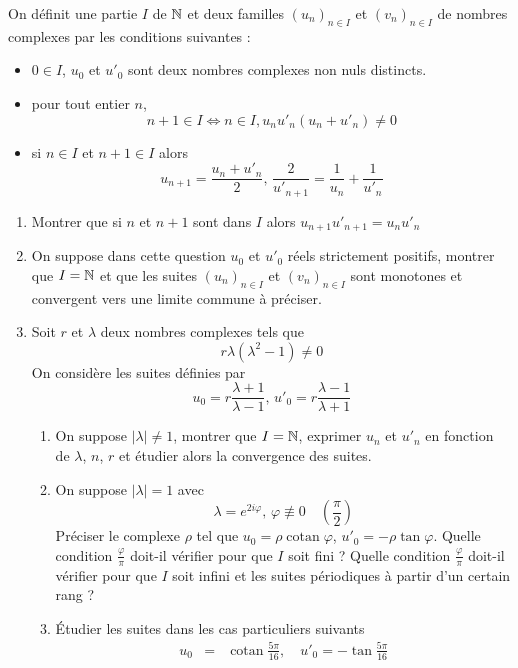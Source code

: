 On d{\'e}finit une partie $I$ de $\mathbb{N}$ et deux familles
$(u_n)_{n\in I}$ et $(v_n)_{n\in I}$ de nombres complexes par les
conditions suivantes :
\begin{itemize}
  \item $0\in I$, $u_0$ et $u'_0$ sont deux nombres complexes non
  nuls distincts.
  \item pour tout entier $n$,
  \[n+1\in I \Leftrightarrow n\in I , u_nu'_n(u_n+u'_n)\neq 0\]
  \item si $n\in I$ et $n+1\in I$ alors
  \[u_{n+1}=\frac{u_n+u'_n}{2},\, \frac{2}{u'_{n+1}}=\frac{1}{u_n}+\frac{1}{u'_n}\]
\end{itemize}
\begin{enumerate}
  \item Montrer que si $n$ et $n+1$ sont dans $I$ alors
  $u_{n+1}u'_{n+1}=u_{n}u'_{n}$
  \item On suppose dans cette question $u_0$ et $u'_0$ r{\'e}els
  strictement positifs, montrer que $I=\mathbb{N}$ et que les suites $(u_n)_{n\in I}$ et $(v_n)_{n\in
  I}$ sont monotones et convergent vers une limite commune {\`a}
  pr{\'e}ciser.
  \item Soit $r$ et $\lambda$ deux nombres complexes tels que
  \[r \lambda(\lambda^2-1)\neq 0\]
  On consid{\`e}re les suites d{\'e}finies par
  \[u_0=r\frac{\lambda+1}{\lambda-1},\, u'_0=r\frac{\lambda-1}{\lambda+1}\]
\begin{enumerate}
  \item On suppose $|\lambda|\neq 1$, montrer que $I=\mathbb{N}$,
  exprimer $u_n$ et $u'_n$ en fonction de $\lambda$, $n$, $r$ et {\'e}tudier alors la convergence des suites.
  \item On suppose $|\lambda|=1$ avec
  \[\lambda=e^{2i\varphi},\, \varphi \not \equiv 0 \quad (\frac{\pi}{2})\]
  Pr{\'e}ciser le complexe $\rho$ tel que $u_0=\rho
  \mathop{\mathrm{cotan}}\varphi$, $u'_0= -\rho
  \tan\varphi$.\newline
  Quelle condition $\frac{\varphi}{\pi}$ doit-il v{\'e}rifier pour
  que $I$ soit fini ?\newline
  Quelle condition $\frac{\varphi}{\pi}$ doit-il v{\'e}rifier pour
  que $I$ soit infini et les suites p{\'e}riodiques {\`a} partir d'un certain rang ?
  \item {\'E}tudier les suites dans les cas particuliers suivants
  \begin{eqnarray*}
  u_0 &=& \mathop{\mathrm{cotan}}\frac{5\pi}{16},\quad u'_0=-\tan
  \frac{5\pi}{16}\\

\end{eqnarray*}
\end{enumerate}
\end{enumerate}
